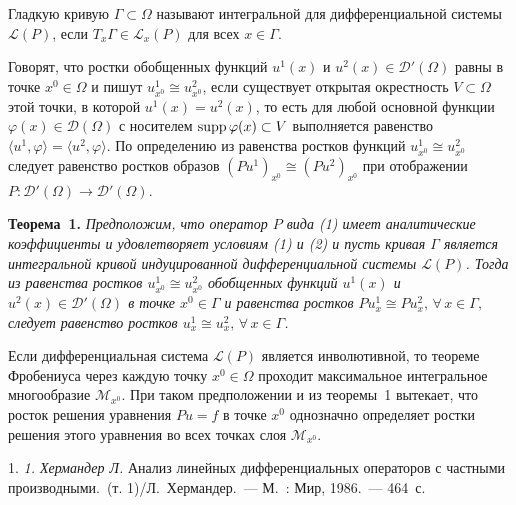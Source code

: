 \documentclass{vzmsthesis}
\begin{document}
Гладкую кривую $\Gamma\subset\Omega$ называют интегральной для дифференциальной системы ${\mathcal L}(P)$, если
$T_x\Gamma\in{\mathcal L}_{x}(P)$
для всех $x\in\Gamma$.

Говорят, что ростки обобщенных  функций $u^1(x)$ и $u^2(x)\in {\mathcal D}'(\Omega)$ равны в точке $x^0\in \Omega$ и пишут  $u_{x^0}^1\cong u_{x^0}^2$, если существует открытая окрестность $V\subset \Omega$ этой точки, в которой $u^1(x)=u^2(x)$, то есть для любой основной функции $\varphi(x)\in {\mathcal D}(\Omega)$ с носителем ${\rm supp}\,\varphi(x)\subset V$ выполняется равенство
$\langle u^1,\varphi  \rangle= \langle u^2,\varphi  \rangle.$
По определению из равенства ростков функций $u_{x^0}^1\cong u_{x^0}^2$ следует равенство ростков образов $(Pu^1)_{x^0}\cong (Pu^2)_{x^0}$ при отображении  $P: {\mathcal D}'(\Omega) \to {\mathcal D}'(\Omega)$.



\textbf{Теорема~1.} {\it Предположим, что оператор $P$ вида {\rm (1)} имеет аналитические коэффициенты и удовлетворяет условиям {\rm (1)} и {\rm (2)} и
пусть кривая $\Gamma$ является интегральной кривой индуцированной дифференциальной системы ${\mathcal L}(P)$.
Тогда из равенства ростков
$u_{x^0}^1\cong u_{x^0}^2$  обобщенных функций
$u^1(x)$ и $u^2(x)\in {\mathcal D}'(\Omega)$
 в  точке $x^0\in \Gamma$ и равенства ростков
$Pu^1_x\cong Pu^2_x,\,\forall\,x\in \Gamma,$ следует равенство ростков  $u^1_x\cong u^2_x,\,\forall\,x\in \Gamma$.
}

Если дифференциальная система ${\mathcal L}(P)$ является инволютивной, то теореме Фробениуса через каждую точку $x^0\in \Omega$ проходит максимальное интегральное многообразие ${\mathcal M}_{x^0}$. При таком предположении и из теоремы~1 вытекает, что росток решения уравнения $Pu=f$ в точке $x^0$ однозначно определяет ростки решения этого уравнения во всех точках слоя ${\mathcal M}_{x^0}$.


\litlist

1. {\it 1. Хермандер Л.} Анализ линейных дифференциальных операторов с частными производными.~(т. 1)/Л.~Хермандер.~--- М.~: Мир, 1986.~--- 464~с.
\end{document}
